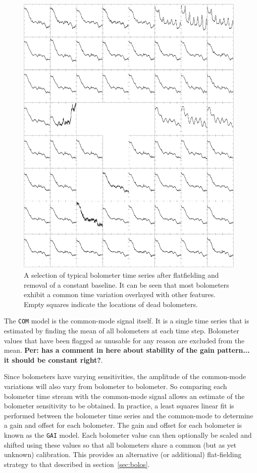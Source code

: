 \documentclass[useAMS,usenatbib,nofootinbib]{mn2e}
\newcommand{\model}[1]{\texttt{#1}}
\begin{document}
\begin{figure}
\centering
\includegraphics[width=\linewidth]{com.pdf}
\caption{A selection of typical bolometer time series after
flatfielding and removal of a constant baseline. It can be seen that
most bolometers exhibit a common time variation overlayed with other
features. Empty squares indicate the locations of dead bolometers.}
\label{fig:com}
\end{figure}

The \model{COM} model is the common-mode signal itself. It is a single
time series that is estimated by finding the mean of all bolometers at
each time step. Bolometer values that have been flagged as unusable
for any reason are excluded from the mean. {\bf Per: has a comment in
here about stability of the gain pattern... it should be constant
right?}.

Since bolometers have varying sensitivities, the amplitude of the
common-mode variations will also vary from bolometer to bolometer. So
comparing each bolometer time stream with the common-mode signal
allows an estimate of the bolometer sensitivity to be obtained. In
practice, a least squares linear fit is performed between the
bolometer time series and the common-mode to determine a gain and
offset for each bolometer.  The gain and offset for each bolometer is
known as the \model{GAI} model. Each bolometer value can then
optionally be scaled and shifted using these values so that all
bolometers share a common (but as yet unknown) calibration. This
provides an alternative (or additional) flat-fielding strategy to that
described in section~\ref{sec:bolos}.
\end{document}
